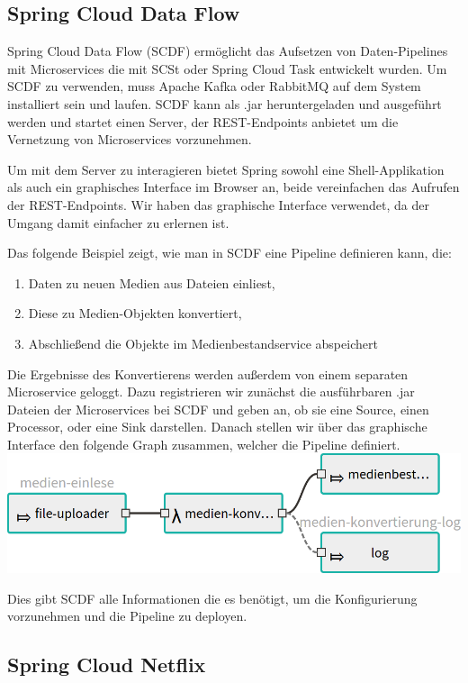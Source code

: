 \documentclass{article}
\begin{document}
\subsection{Spring Cloud Data Flow}

Spring Cloud Data Flow (SCDF) ermöglicht das Aufsetzen von Daten-Pipelines mit Microservices die mit SCSt oder Spring Cloud Task entwickelt wurden.
Um SCDF zu verwenden, muss Apache Kafka oder RabbitMQ auf dem System installiert sein und laufen.
SCDF kann als .jar heruntergeladen und ausgeführt werden und startet einen Server, der REST-Endpoints anbietet um die Vernetzung von Microservices vorzunehmen.

Um mit dem Server zu interagieren bietet Spring sowohl eine Shell-Applikation als auch ein graphisches Interface im Browser an, beide vereinfachen das Aufrufen der REST-Endpoints.
Wir haben das graphische Interface verwendet, da der Umgang damit einfacher zu erlernen ist.

Das folgende Beispiel zeigt, wie man in SCDF eine Pipeline definieren kann, die:
\begin{enumerate}
\item Daten zu neuen Medien aus Dateien einliest,
\item Diese zu Medien-Objekten konvertiert,
\item Abschließend die Objekte im Medienbestandservice abspeichert
\end{enumerate}
Die Ergebnisse des Konvertierens werden außerdem von einem separaten Microservice geloggt.
Dazu registrieren wir zunächst die ausführbaren .jar Dateien der Microservices bei SCDF und geben an, ob sie eine Source, einen Processor, oder eine Sink darstellen.
Danach stellen wir über das graphische Interface den folgende Graph zusammen, welcher die Pipeline definiert.\medskip\\
\includegraphics[width=\textwidth]{stream-small.png}

Dies gibt SCDF alle Informationen die es benötigt, um die Konfigurierung vorzunehmen und die Pipeline zu deployen.

\subsection{Spring Cloud Netflix}
\end{document}
